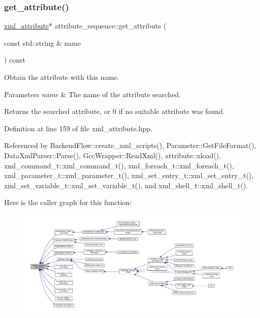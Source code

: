\subsubsection{\texorpdfstring{get\+\_\+attribute()}{get\_attribute()}}
{\footnotesize\ttfamily \hyperlink{classxml__attribute}{xml\+\_\+attribute}$\ast$ attribute\+\_\+sequence\+::get\+\_\+attribute (\begin{DoxyParamCaption}\item[{const std\+::string \&}]{name }\end{DoxyParamCaption}) const\hspace{0.3cm}{\ttfamily [inline]}}



Obtain the attribute with this name. 


\begin{DoxyParams}{Parameters}
{\em name} & The name of the attribute searched. \\
\hline
\end{DoxyParams}
\begin{DoxyReturn}{Returns}
the searched attribute, or 0 if no suitable attribute was found. 
\end{DoxyReturn}


Definition at line 159 of file xml\+\_\+attribute.\+hpp.



Referenced by Backend\+Flow\+::create\+\_\+xml\+\_\+scripts(), Parameter\+::\+Get\+File\+Format(), Data\+Xml\+Parser\+::\+Parse(), Gcc\+Wrapper\+::\+Read\+Xml(), attribute\+::xload(), xml\+\_\+command\+\_\+t\+::xml\+\_\+command\+\_\+t(), xml\+\_\+foreach\+\_\+t\+::xml\+\_\+foreach\+\_\+t(), xml\+\_\+parameter\+\_\+t\+::xml\+\_\+parameter\+\_\+t(), xml\+\_\+set\+\_\+entry\+\_\+t\+::xml\+\_\+set\+\_\+entry\+\_\+t(), xml\+\_\+set\+\_\+variable\+\_\+t\+::xml\+\_\+set\+\_\+variable\+\_\+t(), and xml\+\_\+shell\+\_\+t\+::xml\+\_\+shell\+\_\+t().

Here is the caller graph for this function\+:
\nopagebreak
\begin{figure}[H]
\begin{center}
\leavevmode
\includegraphics[width=350pt]{de/d33/structattribute__sequence_a0d88042550f00dd0bbbb5163f9407e9c_icgraph}
\end{center}
\end{figure}
\mbox{\label{structattribute__sequence_a4d995fdfcb7e65006b615e8c1dd4f96b}} 
